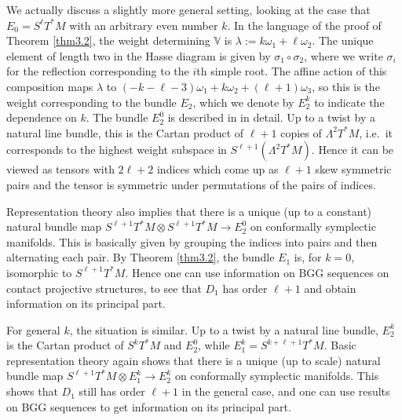 \documentclass[12pt,a4paper]{amsart}
\def\Bbb{\mathbb}
\renewcommand{\o}{\circ}
\newcommand{\la}{\lambda}
\newcommand{\om}{\omega}
\newcommand{\si}{\sigma}
\newcommand{\La}{\Lambda}
\numberwithin{theorem}{section}
\theoremstyle{definition}
\theoremstyle{remark}
\begin{document}
We actually discuss a slightly more general setting, looking at the
case that $E_0=S^\ell T^*M$ with an arbitrary even number $k$. In the
language of the proof of Theorem \ref{thm3.2}, the weight determining
$\Bbb V$ is $\la:=k\om_1+\ell\om_2$. The unique element of length two
in the Hasse diagram is given by $\si_1\o\si_2$, where we write
$\si_i$ for the reflection corresponding to the $i$th simple root. The
affine action of this composition maps $\la$ to
$(-k-\ell-3)\om_1+k\om_2+(\ell+1)\om_3$, so this is the weight
corresponding to the bundle $E_2$, which we denote by $E_2^k$ to
indicate the dependence on $k$. The bundle $E_2^0$ is described in
\cite{E-G} in detail. Up to a twist by a natural line bundle, this is
the Cartan product of $\ell+1$ copies of $\La^2T^*M$, i.e.~it
corresponds to the highest weight subspace in
$S^{\ell+1}(\La^2T^*M)$. Hence it can be viewed as tensors with
$2\ell+2$ indices which come up as $\ell+1$ skew symmetric pairs and
the tensor is symmetric under permutations of the pairs of indices.

Representation theory also implies that there is a unique (up to a
constant) natural bundle map $S^{\ell+1}T^*M\otimes S^{\ell+1}T^*M\to
E_2^0$ on conformally symplectic manifolds. This is basically given by
grouping the indices into pairs and then alternating each pair. By
Theorem \ref{thm3.2}, the bundle $E_1$ is, for $k=0$, isomorphic to
$S^{\ell+1}T^*M$. Hence one can use information on BGG sequences on
contact projective structures, to see that $D_1$ has order $\ell+1$
and obtain information on its principal part.

For general $k$, the situation is similar. Up to a twist by a natural
line bundle, $E_2^k$ is the Cartan product of $S^kT^*M$ and $E_2^0$,
while $E_1^k=S^{k+\ell+1}T^*M$. Basic representation theory again
shows that there is a unique (up to scale) natural bundle map
$S^{\ell+1}T^*M\otimes E_1^k\to E_2^k$ on conformally symplectic
manifolds. This shows that $D_1$ still has order $\ell+1$ in the
general case, and one can use results on BGG sequences to get
information on its principal part.
\end{document}
